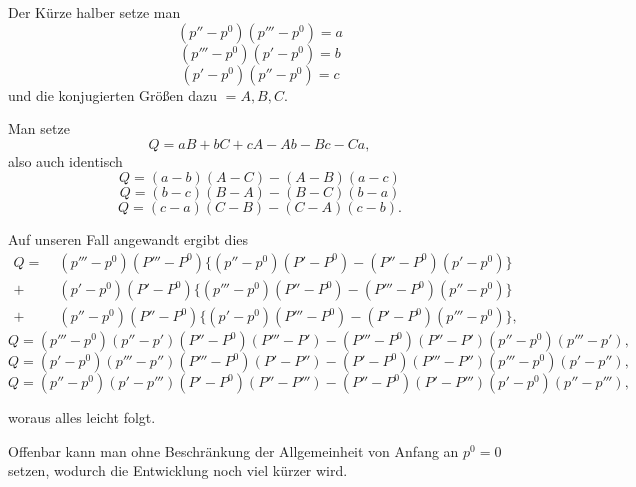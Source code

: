 
Der Kürze halber setze man
\[
(p''-p^0)(p'''-p^0) = a
\]
\[
(p'''-p^0)(p'-p^0) = b
\]
\[
(p'-p^0)(p''-p^0) = c
\]
und die konjugierten Größen dazu $= A, B, C$.

Man setze
\begin{equation}
Q = aB+bC+cA-Ab-Bc-Ca,
\tag*{1)}
\end{equation}
also auch identisch
\begin{equation}
Q = (a-b)(A-C)-(A-B)(a-c)
\tag*{2)}
\end{equation}
\begin{equation}
Q = (b-c)(B-A)-(B-C)(b-a)
\tag*{3)}
\end{equation}
\begin{equation}
Q = (c-a)(C-B)-(C-A)(c-b).
\tag*{4)}
\end{equation}

Auf unseren Fall angewandt ergibt dies
\begin{equation}
\begin{aligned}
Q = \;& (p'''-p^0)(P'''-P^0)\{(p''-p^0)(P'-P^0)-(P''-P^0)(p'-p^0)\}\\
+\;& (p'-p^0)(P'-P^0)\{(p'''-p^0)(P''-P^0)-(P'''-P^0)(p''-p^0)\}\\
+\;& (p''-p^0)(P''-P^0)\{(p'-p^0)(P'''-P^0)-(P'-P^0)(p'''-p^0)\},
\end{aligned}
\tag{1}
\end{equation}
\begin{equation}
Q=(p'''-p^0)(p''-p')(P''-P^0)(P'''-P') - (P'''-P^0)(P''-P')(p''-p^0)(p'''-p'),
\tag{2}
\end{equation}
\begin{equation}
Q=(p'-p^0)(p'''-p'')(P'''-P^0)(P'-P'') - (P'-P^0)(P'''-P'')(p'''-p^0)(p'-p''),
\tag{3}
\end{equation}
\begin{equation}
Q=(p''-p^0)(p'-p''')(P'-P^0)(P''-P''') - (P''-P^0)(P'-P''')(p'-p^0)(p''-p'''),
\tag{4}
\end{equation}

woraus alles leicht folgt.

Offenbar kann man ohne Beschränkung der Allgemeinheit von Anfang an $p^0=0$ setzen, wodurch die Entwicklung noch viel kürzer wird.
